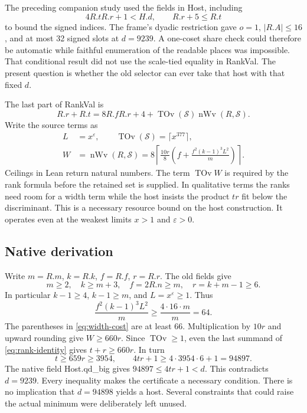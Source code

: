 \documentclass[12pt,letterpaper]{article}
\DeclareRobustCommand{\id}[1]{\mbox{\small\ttfamily #1}}
\begin{document}
The preceding companion study used the fields in \id{Host}, including
\[
     4 R.t R.r+1<H.d,\qquad R.r+5\le R.t
\]
to bound the signed indices. The frame's dyadic restriction gave $o=1$, $|R.A|\le16$, and at most 32 signed slots at $d=9239$. A one-coset share check could therefore be automatic while faithful enumeration of the readable places was impossible. That conditional result did not use the scale-tied equality in \id{RankVal}. The present question is whether the old selector can ever take that host with that fixed $d$.

The last part of \id{RankVal} is
\begin{equation}
 R.r+R.t=8 R.f R.r+4+\operatorname{TOv}(\mathcal S)
                            \operatorname{nWv}(R,\mathcal S).
 \label{eq:rank-identity}
\end{equation}
Write the source terms as
\begin{align}
 L&=x^\varepsilon,\qquad
 \operatorname{TOv}(\mathcal S)=\lceil x^{377}\rceil,\nonumber\\
 W&=\operatorname{nWv}(R,\mathcal S)
  =8\left\lceil\frac{10r}{8}
  \left(f+\frac{f^2(k-1)^3L^2}{m}\right)\right\rceil .
 \label{eq:width-cost}
\end{align}
Ceilings in Lean return natural numbers. The term \(\operatorname{TOv} W\) is required by the rank formula before the retained set is supplied. In qualitative terms the ranks need room for a width term while the host insists the product $tr$ fit below the discriminant. This is a necessary resource bound on the host construction. It operates even at the weakest limits $x>1$ and $\varepsilon>0$.

\subsection{Native derivation}

Write $m=R.m$, $k=R.k$, $f=R.f$, $r=R.r$. The old fields give
\[
 m\ge2,\quad k\ge m+3,\quad f=2R.n\ge m,\quad r=k+m-1\ge6.
\]
In particular \(k-1\ge4\), \(k-1\ge m\), and \(L=x^\varepsilon\ge1\). Thus
\[
 \frac{f^2(k-1)^3 L^2}{m}
 \ge \frac{4\cdot16\cdot m}{m}=64.
\]
The parentheses in \eqref{eq:width-cost} are at least $66$. Multiplication by $10r$ and upward rounding give $W\ge660r$. Since $\operatorname{TOv}\ge1$, even the last summand of \eqref{eq:rank-identity} gives $t+r\ge660r$. In turn
\[
 t\ge659r\ge3954,\qquad 4tr+1\ge4\cdot3954\cdot6+1=94897 .
\]
The native field \id{Host.qd\_big} gives $94897\le4tr+1<d$. This contradicts $d=9239$. Every inequality makes the certificate a necessary condition. There is no implication that $d=94898$ yields a host. Several constraints that could raise the actual minimum were deliberately left unused.
\end{document}
